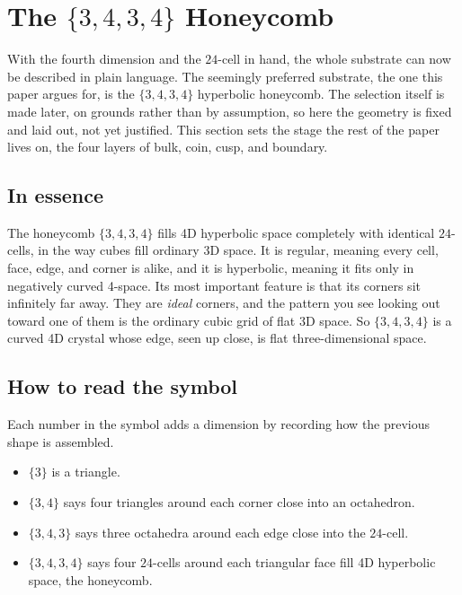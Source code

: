 \section{The \texorpdfstring{$\{3,4,3,4\}$}{3,4,3,4} Honeycomb}

With the fourth dimension and the $24$-cell in hand, the whole substrate can now be described in plain language. The seemingly preferred substrate, the one this paper argues for, is the $\{3,4,3,4\}$ hyperbolic honeycomb. The selection itself is made later, on grounds rather than by assumption, so here the geometry is fixed and laid out, not yet justified. This section sets the stage the rest of the paper lives on, the four layers of bulk, coin, cusp, and boundary.

\subsection{In essence}

The honeycomb $\{3,4,3,4\}$ fills 4D hyperbolic space completely with identical $24$-cells, in the way cubes fill ordinary 3D space. It is regular, meaning every cell, face, edge, and corner is alike, and it is hyperbolic, meaning it fits only in negatively curved 4-space. Its most important feature is that its corners sit infinitely far away. They are \emph{ideal} corners, and the pattern you see looking out toward one of them is the ordinary cubic grid of flat 3D space. So $\{3,4,3,4\}$ is a curved 4D crystal whose edge, seen up close, is flat three-dimensional space.

\subsection{How to read the symbol}

Each number in the symbol adds a dimension by recording how the previous shape is assembled.

\begin{itemize}
  \item $\{3\}$ is a triangle.
  \item $\{3,4\}$ says four triangles around each corner close into an octahedron.
  \item $\{3,4,3\}$ says three octahedra around each edge close into the $24$-cell.
  \item $\{3,4,3,4\}$ says four $24$-cells around each triangular face fill 4D hyperbolic space, the honeycomb.
\end{itemize}

